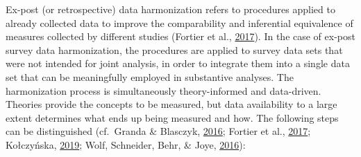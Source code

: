 \documentclass[12pt,]{article}
\begin{document}
Ex-post (or retrospective) data harmonization refers to procedures applied to already collected data to improve the comparability and inferential equivalence of measures collected by different studies (Fortier et al., \protect\hyperlink{ref-Fortier2017a}{2017}). In the case of ex-post survey data harmonization, the procedures are applied to survey data sets that were not intended for joint analysis, in order to integrate them into a single data set that can be meaningfully employed in substantive analyses. The harmonization process is simultaneously theory-informed and data-driven. Theories provide the concepts to be measured, but data availability to a large extent determines what ends up being measured and how. The following steps can be distinguished (cf.~Granda \& Blasczyk, \protect\hyperlink{ref-Granda2016}{2016}; Fortier et al., \protect\hyperlink{ref-Fortier2017a}{2017}; Kołczyńska, \protect\hyperlink{ref-Kolczynska2019}{2019}; Wolf, Schneider, Behr, \& Joye, \protect\hyperlink{ref-Wolf2016}{2016}):
\end{document}
